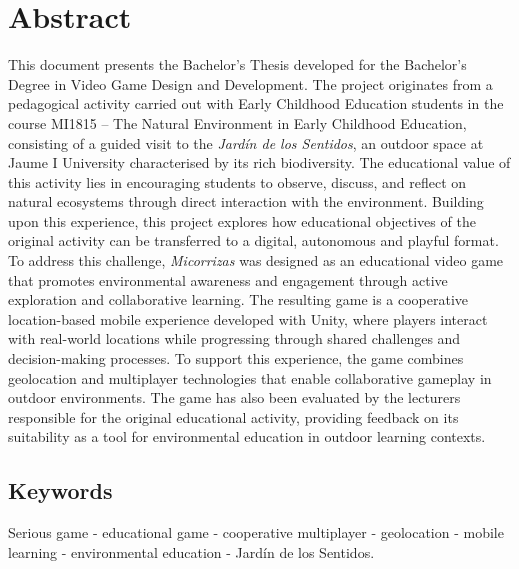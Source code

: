 \chapter*{Abstract}
This document presents the Bachelor’s Thesis developed for the Bachelor’s Degree in Video Game Design and Development. The project originates from a pedagogical activity carried out with Early Childhood Education students in the course MI1815 – The Natural Environment in Early Childhood Education, consisting of a guided visit to the \textit{Jardín de los Sentidos}, an outdoor space at Jaume I University characterised by its rich biodiversity. The educational value of this activity lies in encouraging students to observe, discuss, and reflect on natural ecosystems through direct interaction with the environment.
Building upon this experience, this project explores how educational objectives of the original activity can be transferred to a digital, autonomous and playful format. To address this challenge, \textit{Micorrizas} was designed as an educational video game that promotes environmental awareness and engagement through active exploration and collaborative learning.
The resulting game is a cooperative location-based mobile experience developed with Unity, where players interact with real-world locations while progressing through shared challenges and decision-making processes. To support this experience, the game combines geolocation and multiplayer technologies that enable collaborative gameplay in outdoor environments. The game has also been evaluated by the lecturers responsible for the original educational activity, providing feedback on its suitability as a tool for environmental education in outdoor learning contexts.

\vspace{1cm}
\section*{Keywords}
Serious game - educational game - cooperative multiplayer - geolocation - mobile learning - environmental education - Jardín de los Sentidos.

\clearpage

\tableofcontents
\clearpage

\listoffigures
\clearpage

\listoftables
\clearpage

